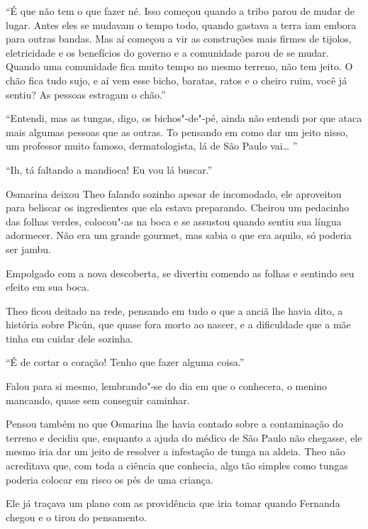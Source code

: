 ``É que não tem o que fazer né. Isso começou quando a tribo parou de
mudar de lugar. Antes eles se mudavam o tempo todo, quando gastava a
terra iam embora para outras bandas. Mas aí começou a vir as construções
mais firmes de tijolos, eletricidade e os benefícios do governo e a
comunidade parou de se mudar. Quando uma comunidade fica muito tempo no
mesmo terreno, não tem jeito. O chão fica tudo sujo, e aí vem esse
bicho, baratas, ratos e o cheiro ruim, você já sentiu? As pessoas
estragam o chão.''

``Entendi, mas as tungas, digo, os bichos"-de"-pé, ainda não entendi por
que ataca mais algumas pessoas que as outras. To pensando em como dar um
jeito nisso, um professor muito famoso, dermatologista, lá de São Paulo
vai\ldots{} ''

``Ih, tá faltando a mandioca! Eu vou lá buscar.''

Osmarina deixou Theo falando sozinho apesar de incomodado, ele
aproveitou para beliscar os ingredientes que ela estava preparando.
Cheirou um pedacinho das folhas verdes, colocou"-as na boca e se assustou
quando sentiu sua língua adormecer. Não era um grande gourmet, mas sabia
o que era aquilo, só poderia ser jambu.

Empolgado com a nova descoberta, se divertiu comendo as folhas e
sentindo seu efeito em sua boca.

\asterisc


Theo ficou deitado na rede, pensando em tudo o que a anciã lhe havia
dito, a história sobre Picún, que quase fora morto ao nascer, e a
dificuldade que a mãe tinha em cuidar dele sozinha.

``É de cortar o coração! Tenho que fazer alguma coisa.''

Falou para si mesmo, lembrando"-se do dia em que o conhecera, o menino
mancando, quase sem conseguir caminhar.

Pensou também no que Osmarina lhe havia contado sobre a contaminação do
terreno e decidiu que, enquanto a ajuda do médico de São Paulo não
chegasse, ele mesmo iria dar um jeito de resolver a infestação de tunga
na aldeia. Theo não acreditava que, com toda a ciência que conhecia,
algo tão simples como tungas poderia colocar em risco os pés de uma
criança.

Ele já traçava um plano com as providência que iria tomar quando
Fernanda chegou e o tirou do pensamento.

